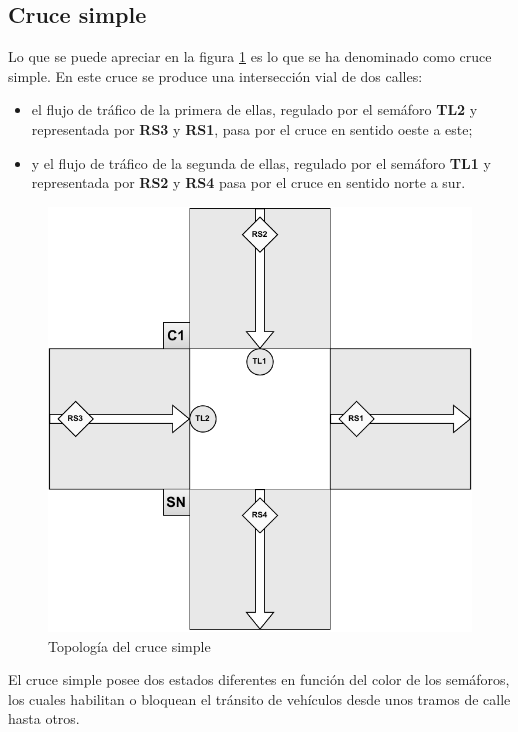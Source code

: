 \subsection{Cruce simple}
Lo que se puede apreciar en la figura \ref{fig:cruce_simple_topologia} es lo que se ha denominado como cruce simple. En este cruce se produce una intersección vial de dos calles: 
\begin{itemize}
    \item el flujo de tráfico de la primera de ellas, regulado por el semáforo \textbf{TL2} y representada por \textbf{RS3} y \textbf{RS1}, pasa por el cruce en sentido oeste a este; 
    \item y el flujo de tráfico de la segunda de ellas, regulado por el semáforo \textbf{TL1} y representada por \textbf{RS2} y \textbf{RS4} pasa por el cruce en sentido norte a sur.
\end{itemize}
\begin{figure}[H]
    \centering
    \includegraphics[width=1\linewidth]{text/image/DCruc-CS-Topologia.pdf}
    \caption{Topología del cruce simple}
    \label{fig:cruce_simple_topologia}
\end{figure}

\newpage
El cruce simple posee dos estados diferentes en función del color de los semáforos, los cuales habilitan o bloquean el tránsito de vehículos desde unos tramos de calle hasta otros.

